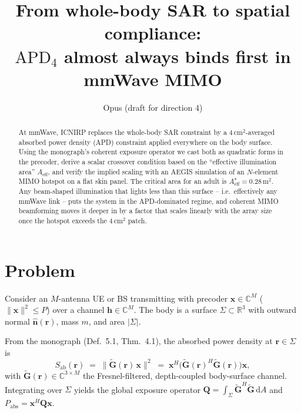 \documentclass[journal]{IEEEtran}
\newcommand{\rr}{\bm{r}}
\newcommand{\xx}{\bm{x}}
\newcommand{\hh}{\bm{h}}
\newcommand{\Gtil}{\widetilde{\mathbf{G}}}
\newcommand{\Sab}{S_{\mathrm{ab}}}
\newcommand{\APD}{\mathrm{APD}}
\newcommand{\Pabs}{P_{\mathrm{abs}}}
\newcommand{\Q}{\mathbf{Q}}
\newcommand{\Aeff}{A_{\mathrm{eff}}}
\begin{document}
\title{From whole-body SAR to spatial compliance: \\
  $\APD_{4}$ almost always binds first in mmWave MIMO}
\author{Opus (draft for direction 4)}
\maketitle

\begin{abstract}
At mmWave, ICNIRP replaces the whole-body SAR constraint by a
$4\,\mathrm{cm}^2$-averaged absorbed power density (APD) constraint
applied everywhere on the body surface. Using the monograph's coherent
exposure operator we cast both as quadratic forms in the precoder,
derive a scalar crossover condition based on the ``effective
illumination area'' $\Aeff$, and verify the implied scaling with an
AEGIS simulation of an $N$-element MIMO hotspot on a flat skin panel.
The critical area for an adult is $\Aeff^\star=0.28\,\mathrm{m}^2$.
Any beam-shaped illumination that lights less than this surface --
i.e.\ effectively any mmWave link -- puts the system in the
APD-dominated regime, and coherent MIMO beamforming moves it deeper
in by a factor that scales linearly with the array size once the
hotspot exceeds the $4\,\mathrm{cm}^2$ patch.
\end{abstract}

\section{Problem}\label{sec:problem}

Consider an $M$-antenna UE or BS transmitting with precoder
$\xx\in\mathbb{C}^M$ ($\lVert\xx\rVert^2\le P$) over a channel
$\hh\in\mathbb{C}^M$. The body is a surface $\Sigma\subset\mathbb{R}^3$
with outward normal $\hat{\bm n}(\rr)$, mass $m$, and area
$|\Sigma|$.

From the monograph (Def.~5.1, Thm.~4.1), the absorbed power density at
$\rr\in\Sigma$ is
\begin{equation}\label{eq:Sab}
  \Sab(\rr) \;=\; \bigl\lVert\Gtil(\rr)\,\xx\bigr\rVert^2
  \;=\; \xx^H\bigl(\Gtil(\rr)^H\Gtil(\rr)\bigr)\xx ,
\end{equation}
with $\Gtil(\rr)\in\mathbb{C}^{3\times M}$ the Fresnel-filtered,
depth-coupled body-surface channel. Integrating over $\Sigma$ yields
the global exposure operator $\Q=\int_\Sigma\Gtil^H\Gtil\,\mathrm{d} A$
and $\Pabs=\xx^H\Q\xx$.
\end{document}
